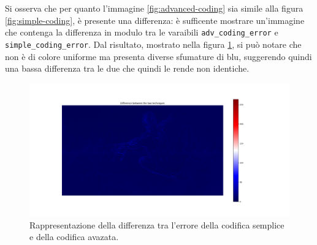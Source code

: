 \FloatBarrier\noindent Si osserva che per quanto l'immagine \ref{fig:advanced-coding} sia simile alla figura \ref{fig:simple-coding}, è presente una differenza: è sufficente mostrare un'immagine che contenga la differenza in modulo tra le varaibili \texttt{adv\_coding\_error} e \texttt{simple\_coding\_error}. Dal risultato, mostrato nella figura \ref{fig:error-difference}, si può notare che non è di colore uniforme ma presenta diverse sfumature di blu, suggerendo quindi una bassa differenza tra le due che quindi le rende non identiche.

\begin{figure}[h]
    \centering
    \includegraphics[width = .9\textwidth]{hw-1/report/imgs/error-difference.png}
    \caption{Rappresentazione della differenza tra l'errore della codifica semplice e della codifica avazata.}
    \label{fig:error-difference}
\end{figure}

